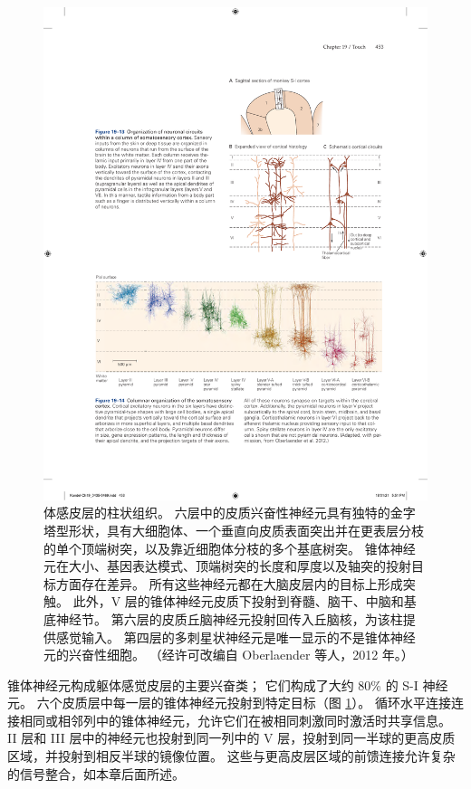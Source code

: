 \begin{figure}[htbp]
	\centering
	\includegraphics[width=1.0\linewidth]{chap19/fig_19_14}
	\caption{体感皮层的柱状组织。 
		六层中的皮质兴奋性神经元具有独特的金字塔型形状，具有大细胞体、一个垂直向皮质表面突出并在更表层分枝的单个顶端树突，以及靠近细胞体分枝的多个基底树突。 
		锥体神经元在大小、基因表达模式、顶端树突的长度和厚度以及轴突的投射目标方面存在差异。 
		所有这些神经元都在大脑皮层内的目标上形成突触。 
		此外，V 层的锥体神经元皮质下投射到脊髓、脑干、中脑和基底神经节。 
		第六层的皮质丘脑神经元投射回传入丘脑核，为该柱提供感觉输入。 
		第四层的多刺星状神经元是唯一显示的不是锥体神经元的兴奋性细胞。 （经许可改编自 Oberlaender 等人，2012 年。）}
	\label{fig:19_14}
\end{figure}


锥体神经元构成躯体感觉皮层的主要兴奋类； 它们构成了大约 80\% 的 S-I 神经元。 
六个皮质层中每一层的锥体神经元投射到特定目标（图 \ref{fig:19_14}）。 
循环水平连接连接相同或相邻列中的锥体神经元，允许它们在被相同刺激同时激活时共享信息。 
II 层和 III 层中的神经元也投射到同一列中的 V 层，投射到同一半球的更高皮质区域，并投射到相反半球的镜像位置。 
这些与更高皮层区域的前馈连接允许复杂的信号整合，如本章后面所述。


